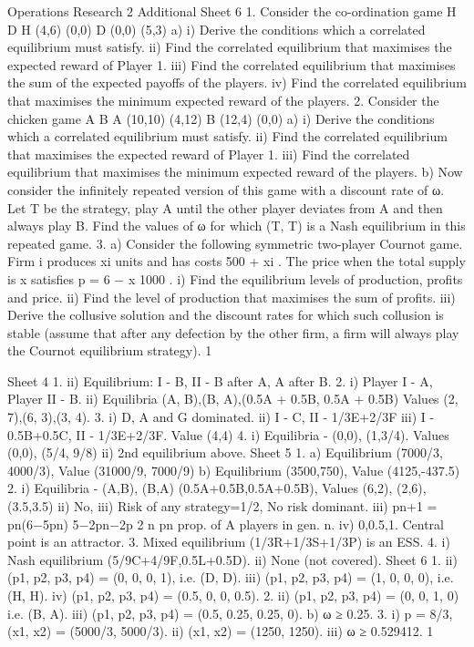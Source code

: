 Operations Research 2
Additional Sheet 6
1. Consider the co-ordination game
H D
H (4,6) (0,0)
D (0,0) (5,3)
a) i) Derive the conditions which a correlated equilibrium must satisfy.
ii) Find the correlated equilibrium that maximises the expected reward of Player 1.
iii) Find the correlated equilibrium that maximises the sum of the expected payoffs of
the players.
iv) Find the correlated equilibrium that maximises the minimum expected reward of
the players.
2. Consider the chicken game
A B
A (10,10) (4,12)
B (12,4) (0,0)
a) i) Derive the conditions which a correlated equilibrium must satisfy.
ii) Find the correlated equilibrium that maximises the expected reward of Player 1.
iii) Find the correlated equilibrium that maximises the minimum expected reward of
the players.
b) Now consider the infinitely repeated version of this game with a discount rate of ω.
Let T be the strategy, play A until the other player deviates from A and then always play
B. Find the values of ω for which (T, T) is a Nash equilibrium in this repeated game.
3. a) Consider the following symmetric two-player Cournot game. Firm i produces xi
units and has costs 500 + xi
. The price when the total supply is x satisfies p = 6 −
x
1000 .
i) Find the equilibrium levels of production, profits and price.
ii) Find the level of production that maximises the sum of profits.
iii) Derive the collusive solution and the discount rates for which such collusion is stable
(assume that after any defection by the other firm, a firm will always play the Cournot
equilibrium strategy).
1


Sheet 4
1. ii) Equilibrium: I - B, II - B after A, A after B.
2. i) Player I - A, Player II - B.
ii) Equilibria (A, B),(B, A),(0.5A + 0.5B, 0.5A + 0.5B)
Values (2, 7),(6, 3),(3, 4).
3. i) D, A and G dominated.
ii) I - C, II - 1/3E+2/3F
iii) I - 0.5B+0.5C, II - 1/3E+2/3F. Value (4,4)
4. i) Equilibria - (0,0), (1,3/4). Values (0,0), (5/4, 9/8)
ii) 2nd equilibrium above.
Sheet 5
1. a) Equilibrium (7000/3, 4000/3), Value (31000/9, 7000/9)
b) Equilibrium (3500,750), Value (4125,-437.5)
2. i) Equilibria - (A,B), (B,A) (0.5A+0.5B,0.5A+0.5B), Values (6,2), (2,6), (3.5,3.5)
ii) No, iii) Risk of any strategy=1/2, No risk dominant.
iii) pn+1 =
pn(6−5pn)
5−2pn−2p
2
n
pn prop. of A players in gen. n.
iv) 0,0.5,1. Central point is an attractor.
3. Mixed equilibrium (1/3R+1/3S+1/3P) is an ESS.
4. i) Nash equilibrium (5/9C+4/9F,0.5L+0.5D).
ii) None (not covered).
Sheet 6
1. ii) (p1, p2, p3, p4) = (0, 0, 0, 1), i.e. (D, D).
iii) (p1, p2, p3, p4) = (1, 0, 0, 0), i.e. (H, H).
iv) (p1, p2, p3, p4) = (0.5, 0, 0, 0.5).
2. ii) (p1, p2, p3, p4) = (0, 0, 1, 0) i.e. (B, A).
iii) (p1, p2, p3, p4) = (0.5, 0.25, 0.25, 0).
b) ω ≥ 0.25.
3. i) p = 8/3, (x1, x2) = (5000/3, 5000/3).
ii) (x1, x2) = (1250, 1250).
iii) ω ≥ 0.529412.
1
